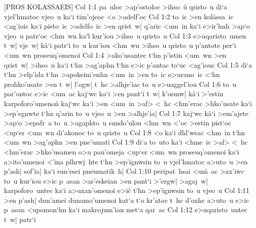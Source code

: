 [PROS KOLASSAEIS]
\vs Col 1:1
pa~uloc
>ap'ostoloc
>ihso~u\r{}
qristo~u
di`a
vjel'hmatoc
vjeo~u
ka`i
tim'ojeoc
<o
>adelf'oc\bibvsend
\vs Col 1:2
to~ic
>en
kol\r{a}ssa~ic
<ag'ioic
ka`i
pisto~ic
>adelfo~ic
>en
qrist~w|
q'aric
<um~in
ka`i
e>ir'hnh
>ap`o
vjeo~u
patr`oc
<hm~wn
ka`i\r{}
kur'iou
>ihso~u
qristo~u\bibvsend
\vs Col 1:3
e>uqaristo~umen
t~w|
vje~w|
k\r{a}`i
patr`i
to~u
kur'iou
<hm~wn
>ihso~u
qristo~u
p'antote
per`i
<um~wn
proseuq'omenoi\bibvsend
\vs Col 1:4
>ako'usantec
t`hn
p'istin
<um~wn
>en
qrist~w|
>ihso~u
ka`i
t`hn
>ag'aphn
\r{t}`hn
e>ic
p'antac
to`uc
<ag'iouc\bibvsend
\vs Col 1:5
di`a
t`hn
>elp'ida
t`hn
>apokeim'enhn
<um~in
>en
to~ic
o>urano~ic
<`hn
prohko'usate
>en
t~w|
l'ogw|
t~hc
>alhje'iac
to~u
e>uaggel'iou\bibvsend
\vs Col 1:6
to~u
par'ontoc
e>ic
<um~ac
kaj`wc
ka`i
>en
pant`i
t~w|
k'osmw|
k\r{a}`i
>'estin
karpoforo'umeno\r{n}
kaj`wc
ka`i
>en
<um~in
>af>
<~hc
<hm'erac
>hko'usate
ka`i
>ep'egnwte
t`hn
q'arin
to~u
vjeo~u
>en
>alhje'ia|\bibvsend
\vs Col 1:7
kaj`wc
k\r{a}`i
>em'ajete
>ap`o
>epafr~a
to~u
>agaphto~u
sundo'ulou
<hm~wn
<'oc
>estin
pist`oc
<up`er
<um~wn
di'akonoc
to~u
qristo~u\bibvsend
\vs Col 1:8
<o
ka`i
dhl'wsac
<hm~in
t`hn
<um~wn
>ag'aphn
>en
pne'umati\bibvsend
\vs Col 1:9
di`a
to~uto
ka`i
<hme~ic
>af>
<~hc
<hm'erac
>hko'usamen
o>u
pau'omeja
<up`er
<um~wn
proseuq'omenoi
ka`i
a>ito'umenoi
<'ina
plhrwj~hte
t`hn
>ep'ignwsin
to~u
vjel'hmatoc
a>uto~u
>en
p'ash|
sof'ia|
ka`i
sun'esei
pneumatik~h|\bibvsend
\vs Col 1:10
peripat~hsai
<u\r{m}~ac
>ax'iwc
to~u
kur'iou
e>ic
p~asan
>ar'eskeian
>en
pant`i
>'ergw|
>agaj~w|
karpoforo~untec
ka`i
a>uxan'omenoi
e>ic\r{}
t`hn
>ep'ignwsin
to~u
vjeo~u\bibvsend
\vs Col 1:11
>en
p'ash|
dun'amei
dunamo'umenoi
kat`a
t`o
kr'atoc
t~hc
d'oxhc
a>uto~u
e>ic
p~asan
<upomon`hn
ka`i
makrojum'ian
met`a
qar~ac\bibvsend
\vs Col 1:12
e>uqaristo~untec
t~w|
patr`i
